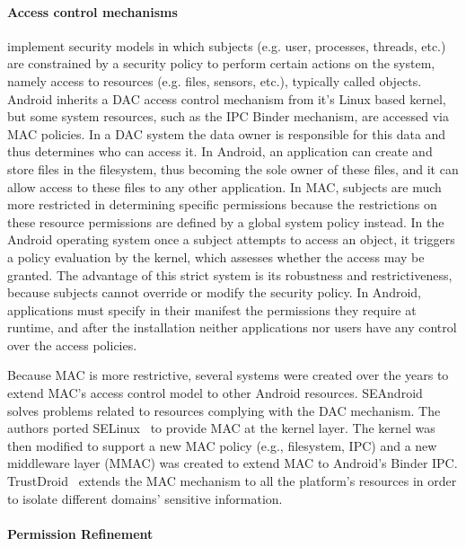 \paragraph{\textbf{Access control mechanisms}} implement security models in which subjects (e.g. user, processes, threads, etc.) are constrained by a security policy to perform certain actions on the system, namely access to resources (e.g. files, sensors, etc.), typically called objects. Android inherits a \ac{DAC} access control mechanism from it's Linux based kernel, but some system resources, such as the IPC Binder mechanism, are accessed via \ac{MAC} policies. In a \ac{DAC} system the data owner is responsible for this data and thus determines who can access it. In Android, an application can create and store files in the filesystem, thus becoming the sole owner of these files, and it can allow access to these files to any other application. In \ac{MAC}, subjects are much more restricted in determining specific permissions because the restrictions on these resource permissions are defined by a global system policy instead. In the Android operating system once a subject attempts to access an object, it triggers a policy evaluation by the kernel, which assesses whether the access may be granted. The advantage of this strict system is its robustness and restrictiveness, because subjects cannot override or modify the security policy. In Android, applications must specify in their manifest the permissions they require at runtime, and after the installation neither applications nor users have any control over the access policies.

Because \ac{MAC} is more restrictive, several systems were created over the years to extend \ac{MAC}'s access control model to other Android resources. SEAndroid~\cite{smalley2013security} solves problems related to resources complying with the \ac{DAC} mechanism. The authors ported SELinux~\cite{peter2001integrating} to provide \ac{MAC} at the kernel layer. The kernel was then modified to support a new \ac{MAC} policy (e.g., filesystem, IPC) and a new middleware layer (MMAC) was created to extend \ac{MAC} to Android's Binder IPC. TrustDroid~\cite{bugiel2011practical} extends the \ac{MAC} mechanism to all the platform's resources in order to isolate different domains' sensitive information.

\paragraph{\textbf{Permission Refinement}} %

